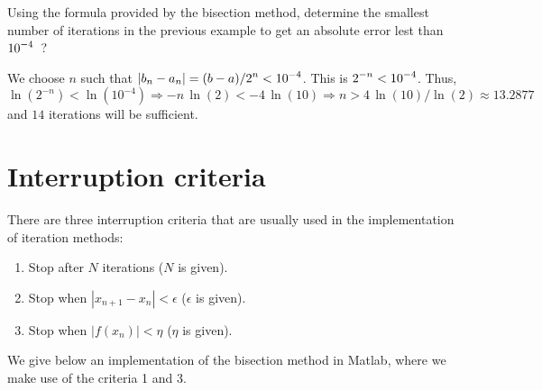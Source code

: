 \begin{egg}
Using the formula provided by the bisection method, determine the
smallest number of iterations in the previous example to get an
absolute error lest than $\displaystyle 10^{-4}$\ ?

We choose $n$ such that
$\displaystyle |b_n- a_n| = (b-a)/2^n < 10^{-4}$.  This is
$\displaystyle 2^{-n}< 10^{-4}$.  Thus,
\[
  \ln(2^{-n})< \ln(10^{-4}) \Rightarrow 
-n\,\ln(2) < -4\,\ln(10) \Rightarrow n>4\,\ln(10)/\ln(2) \approx
13.2877
\]
and $14$ iterations will be sufficient.
\end{egg}

\section{Interruption criteria}

There are three interruption criteria that are usually used in the
implementation of iteration methods:
\begin{enumerate}
\item  Stop after $N$ iterations ($N$ is given).
\item  Stop when $|x_{n+1}-x_n|<\epsilon$ ($\epsilon$ is given).
\item  Stop when $|f(x_n)|<\eta$ ($\eta$ is given).
\end{enumerate}

We give below an implementation of the bisection method in Matlab,
where we make use of the criteria 1 and 3.

